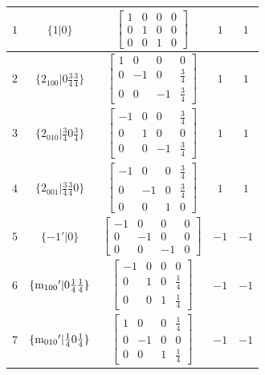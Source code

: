 \documentclass[fleqn,8pt]{jsarticle}
\begin{document}
\begin{longtable}{ccccc}
$ 1 $ & $ \{1|0\} $ & $ \begin{bmatrix} 1 & 0 & 0 & 0 \\ 0 & 1 & 0 & 0 \\ 0 & 0 & 1 & 0 \end{bmatrix} $ & $ 1 $ & $ 1 $ \\ \hline
$ 2 $ & $ \{2{}_{100}|0 \frac{3}{4} \frac{3}{4}\} $ & $ \begin{bmatrix} 1 & 0 & 0 & 0 \\ 0 & -1 & 0 & \frac{3}{4} \\ 0 & 0 & -1 & \frac{3}{4} \end{bmatrix} $ & $ 1 $ & $ 1 $ \\ \hline
$ 3 $ & $ \{2{}_{010}|\frac{3}{4} 0 \frac{3}{4}\} $ & $ \begin{bmatrix} -1 & 0 & 0 & \frac{3}{4} \\ 0 & 1 & 0 & 0 \\ 0 & 0 & -1 & \frac{3}{4} \end{bmatrix} $ & $ 1 $ & $ 1 $ \\ \hline
$ 4 $ & $ \{2{}_{001}|\frac{3}{4} \frac{3}{4} 0\} $ & $ \begin{bmatrix} -1 & 0 & 0 & \frac{3}{4} \\ 0 & -1 & 0 & \frac{3}{4} \\ 0 & 0 & 1 & 0 \end{bmatrix} $ & $ 1 $ & $ 1 $ \\ \hline
$ 5 $ & $ \{-1{}'|0\} $ & $ \begin{bmatrix} -1 & 0 & 0 & 0 \\ 0 & -1 & 0 & 0 \\ 0 & 0 & -1 & 0 \end{bmatrix} $ & $ -1 $ & $ -1 $ \\ \hline
$ 6 $ & $ \{{\rm m}_{100}{}'|0 \frac{1}{4} \frac{1}{4}\} $ & $ \begin{bmatrix} -1 & 0 & 0 & 0 \\ 0 & 1 & 0 & \frac{1}{4} \\ 0 & 0 & 1 & \frac{1}{4} \end{bmatrix} $ & $ -1 $ & $ -1 $ \\ \hline
$ 7 $ & $ \{{\rm m}_{010}{}'|\frac{1}{4} 0 \frac{1}{4}\} $ & $ \begin{bmatrix} 1 & 0 & 0 & \frac{1}{4} \\ 0 & -1 & 0 & 0 \\ 0 & 0 & 1 & \frac{1}{4} \end{bmatrix} $ & $ -1 $ & $ -1 $ \\ \hline

\end{longtable}
\end{document}
